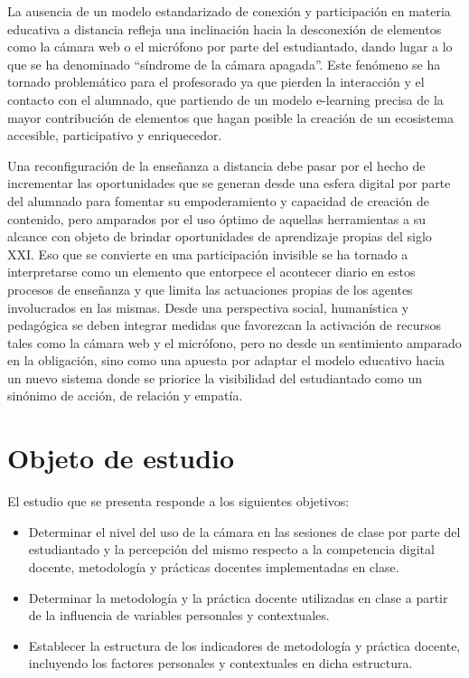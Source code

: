 \documentclass[spanish]{textolivre}
\begin{document}
La ausencia de un modelo estandarizado de conexión y participación en materia educativa a distancia refleja una inclinación hacia la desconexión de elementos como la cámara web o el micrófono por parte del estudiantado, dando lugar a lo que se ha denominado “síndrome de la cámara apagada”. Este fenómeno se ha tornado problemático para el profesorado ya que pierden la interacción y el contacto con el alumnado, que partiendo de un modelo e-learning precisa de la mayor contribución de elementos que hagan posible la creación de un ecosistema accesible, participativo y enriquecedor.

Una reconfiguración de la enseñanza a distancia debe pasar por el hecho de incrementar las oportunidades que se generan desde una esfera digital por parte del alumnado para fomentar su empoderamiento y capacidad de creación de contenido, pero amparados por el uso óptimo de aquellas herramientas a su alcance con objeto de brindar oportunidades de aprendizaje propias del siglo XXI. Eso que se convierte en una participación invisible se ha tornado a interpretarse como un elemento que entorpece el acontecer diario en estos procesos de enseñanza y que limita las actuaciones propias de los agentes involucrados en las mismas. Desde una perspectiva social, humanística y pedagógica se deben integrar medidas que favorezcan la activación de recursos tales como la cámara web y el micrófono, pero no desde un sentimiento amparado en la obligación, sino como una apuesta por adaptar el modelo educativo hacia un nuevo sistema donde se priorice la visibilidad del estudiantado como un sinónimo de acción, de relación y empatía.



\section{Objeto de estudio}\label{sec-objeto}
El estudio que se presenta responde a los siguientes objetivos:
\begin{itemize}
    \item Determinar el nivel del uso de la cámara en las sesiones de clase por parte del estudiantado y la percepción del mismo respecto a la competencia digital docente, metodología y prácticas docentes implementadas en clase.
    \item Determinar la metodología y la práctica docente utilizadas en clase a partir de la influencia de variables personales y contextuales.
    \item Establecer la estructura de los indicadores de metodología y práctica docente, incluyendo los factores personales y contextuales en dicha estructura.
\end{itemize}
\end{document}
